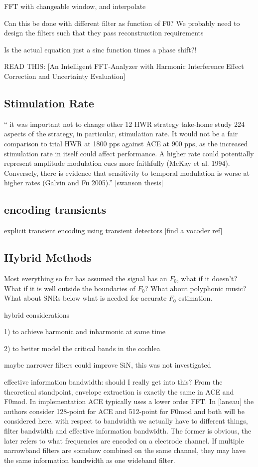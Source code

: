 \documentclass [11pt, proquest,oneside] {ganter_thesis}[2015/03/03]
\begin{document}
FFT with changeable window, and interpolate

Can this be done with different filter as function of F0?
We probably need to design the filters such that they pass reconstruction requirements

Is the actual equation just a sinc function times a phase shift?!

READ THIS: [An Intelligent FFT-Analyzer with Harmonic Interference Effect Correction and Uncertainty Evaluation]

\subsection{Stimulation Rate}

`` it was important not to change other
12 HWR strategy take-home study 224
aspects of the strategy, in particular, stimulation rate. It would not be a fair comparison to trial HWR at 1800 pps against ACE at 900 pps, as the increased stimulation rate in itself could affect performance. A higher rate could potentially represent amplitude modulation cues more faithfully (McKay et al. 1994). Conversely, there is evidence that sensitivity to temporal modulation is worse at higher rates (Galvin and Fu 2005).''
[swanson thesis]

\subsection{encoding transients}

explicit transient encoding using transient detectors  [find a vocoder ref]

\subsection{Hybrid Methods}

Most everything so far has assumed the signal has an $F_0$, what if it doesn't?  What if it is well outside the boundaries of $F_0$?  What about polyphonic music?  What about SNRs below what is needed for accurate $F_0$ estimation.

hybrid considerations

1) to achieve harmonic and inharmonic at same time

2) to better model the critical bands in the cochlea

maybe narrower filters could improve SiN, this was not investigated

effective information bandwidth: should I really get into this?
From the theoretical standpoint, envelope extraction is exactly the same in ACE and F0mod.  In implementation ACE typically uses a lower order FFT.  In [laneau] the authors consider 128-point for ACE and 512-point for F0mod and both will be considered here.
        with respect to bandwidth we actually have to different things, filter bandwidth and effective information bandwidth.  The former is obvious, the later refers to what frequencies are encoded on a electrode channel.  If multiple narrowband filters are somehow combined on the same channel, they may have the same information bandwidth as one wideband filter.
        
\end{document}
